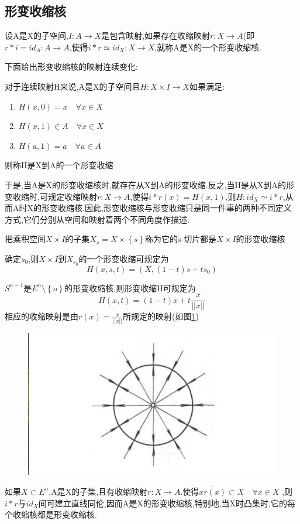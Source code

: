 \subsection*{形变收缩核}
\begin{definition}
    设A是X的子空间,\(I : A \rightarrow X \)是包含映射,如果存在收缩映射\(r : X \rightarrow A \)(即\(r* i = id_A : A \rightarrow A \),使得\(i * r \simeq id_X : X \rightarrow X  \),就称A是X的一个形变收缩核.
\end{definition}
下面给出形变收缩核的映射连续变化:
\begin{definition}
    对于连续映射H来说,A是X的子空间且\(H: X \times I \rightarrow X \)如果满足: 
    \begin{enumerate}
        \item \(H(x,0) = x  \quad \forall x \in X \) \\
        \item \(H(x,1) \in A  \quad \forall x \in  X\) \\
        \item \(H(a,1) = a  \quad \forall a \in A \)
    \end{enumerate}
    则称H是X到A的一个形变收缩
    \end{definition}
    于是,当A是X的形变收缩核时,就存在从X到A的形变收缩.反之,当H是从X到A的形变收缩时,可规定收缩映射\(r: X \rightarrow A\),使得\(i*r(x)= H(x,1) \),则\(H: id_X \simeq i * r\),从而A时X的形变收缩核.因此,形变收缩核与形变收缩只是同一件事的两种不同定义方式,它们分别从空间和映射着两个不同角度作描述.
    \begin{example}
        把乘积空间\(X \times I \)的子集\(X_s = X \times \left\{s\right\}\)称为它的s-切片都是\(X \times I \)的形变收缩核
    \end{example}
    \begin{solution}
        确定\(s_0\),则\(X \times I\)到\(X_{s_0}\)的一个形变收缩可规定为\[H(x,s,t) = (X , (1-t)s+ts_0)\]
    \end{solution}
    \begin{example}
        \(S^{n-1}\)是\(E^{n} \setminus \left\{o\right\}\)的形变收缩核,则形变收缩H可规定为\[H(x,t) = (1-t)x + t\frac{x}{||x||}\]
        相应的收缩映射是由\(r(x) = \frac{x}{||x||}\)所规定的映射(如图\ref{fig:enter-label_27})
        \begin{figure}[H]
            \centering
            \includegraphics[width=0.5\linewidth]{image_27.png}
            \caption{}
            \label{fig:enter-label_27}
        \end{figure}
        如果\(X \subset E^n\),A是X的子集,且有收缩映射\(r: X \rightarrow A \).使得\(\overline{xr(x)} \subset X \quad \forall x \in X \) ,则\(i*r\)与\(id_X\)间可建立直线同伦,因而A是X的形变收缩核,特别地,当X时凸集时,它的每个收缩核都是形变收缩核.
    \end{example}

